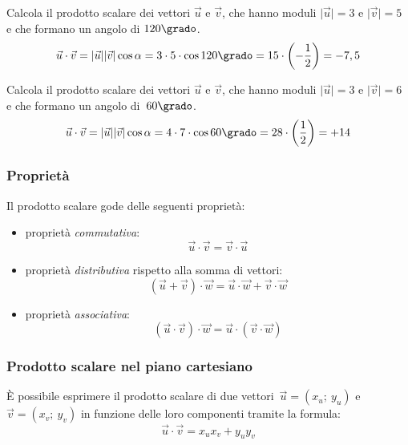 \begin{exrig}
 \begin{esempio}
  Calcola il prodotto scalare dei  vettori $\vec{u}$ e $\vec{v}$, 
  che hanno moduli $\lvert\vec{u}\rvert= 3 \text{ e } \lvert\vec{v}\rvert=5$ 
  e che formano un angolo di $120\grado$.
  \[\vec{u} \cdot \vec{v} = 
    \lvert\vec{u}\rvert\lvert\vec{v}\rvert \cos \alpha=
    3 \cdot 5 \cdot \cos 120\grado = 15 \cdot \left(-\frac{1}{2} \right)=
    -7,5\]
 \end{esempio}

 \begin{esempio}
  Calcola il prodotto scalare dei  vettori $\vec{u}$ e $\vec{v}$, 
  che hanno moduli $\lvert\vec{u}\rvert= 3 \text{ e } \lvert\vec{v}\rvert=6$ 
  e che formano un angolo di~$60\grado$.
  \[\vec{u} \cdot \vec{v} = 
    \lvert\vec{u}\rvert\lvert\vec{v}\rvert \cos \alpha=
    4 \cdot 7 \cdot \cos 60\grado = 28 \cdot \left(\frac{1}{2} \right)=
    +14\]
 \end{esempio}

\end{exrig}

\subsubsection{Proprietà}

Il prodotto scalare gode delle seguenti proprietà:
\begin{itemize}
 \item proprietà \emph{commutativa}:
  \[\vec{u} \cdot \vec{v} = \vec{v} \cdot \vec{u}\]
 \item proprietà \emph{distributiva} rispetto alla somma di vettori:
  \[\left(\vec{u} + \vec{v} \right) \cdot \vec{w} = 
    \vec{u} \cdot \vec{w} + \vec{v} \cdot \vec{w}\]
 \item proprietà \emph{associativa}:
  \[\left(\vec{u} \cdot \vec{v} \right) \cdot \vec{w} = 
    \vec{u} \cdot \left(\vec{v} \cdot \vec{w} \right)\]
\end{itemize}

\subsubsection{Prodotto scalare nel piano cartesiano}

È possibile esprimere il prodotto scalare di due 
vettori~$\vec{u}=(x_u;~y_u)$ e $\vec{v}=(x_v;~y_v)$ 
in funzione delle loro componenti tramite la formula:
\[\vec{u} \cdot \vec{v} = x_u x_v + y_u y_v\]

